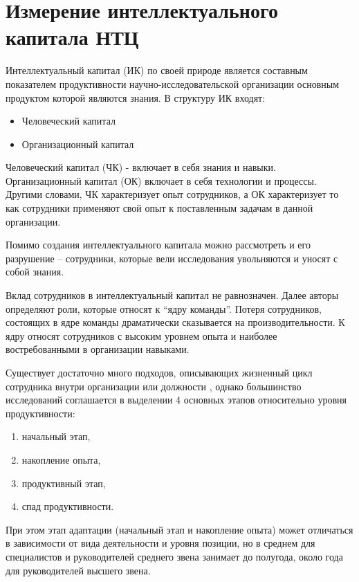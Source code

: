 \section{Измерение интеллектуального капитала НТЦ}
\label{sec:ic}
Интеллектуальный капитал (ИК) по своей природе является составным показателем продуктивности научно-исследовательской организации основным продуктом которой являются знания. В структуру ИК входят:
\begin{itemize}
\tightlist
\item Человеческий капитал 
\item Организационный капитал 
\end{itemize}

Человеческий капитал (ЧК) - включает в себя знания и навыки. 
Организационный капитал (ОК) включает в себя технологии и процессы. 
Другими словами, ЧК характеризует опыт сотрудников, а ОК характеризует то как сотрудники применяют свой опыт к поставленным задачам в данной организации. 

Помимо создания интеллектуального капитала  можно рассмотреть и его разрушение – сотрудники, которые вели исследования увольняются и уносят с собой знания.

Вклад сотрудников в интеллектуальный капитал не равнозначен. 
Далее авторы определяют роли, которые относят к ``ядру команды''. 
Потеря сотрудников, состоящих в ядре команды драматически сказывается на производительности. 
К ядру относят сотрудников с высоким уровнем опыта и наиболее востребованными в организации навыками.

Существует достаточно много подходов, описывающих жизненный цикл сотрудника внутри организации или должности , однако большинство исследований соглашается в выделении 4 основных этапов относительно уровня продуктивности:

\begin{enumerate}
\tightlist
\item начальный этап, 
\item накопление опыта, 
\item продуктивный этап, 
\item спад продуктивности.  
\end{enumerate}

При этом этап адаптации (начальный этап и накопление опыта) может отличаться в зависимости от вида деятельности и уровня позиции, но в среднем для специалистов и руководителей среднего звена занимает до полугода, около года для руководителей высшего звена.

